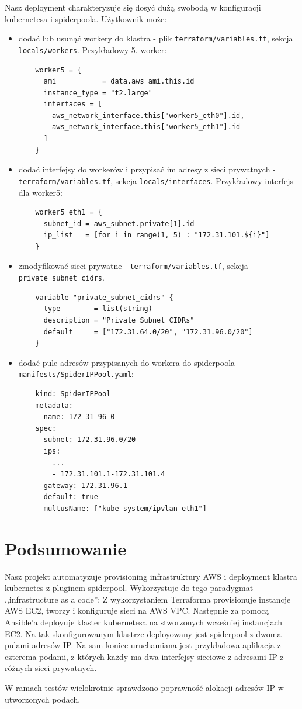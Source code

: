 \documentclass[onecolumn,12pt]{article}
\begin{document}
Nasz deployment charakteryzuje się dosyć dużą swobodą w konfiguracji kubernetesa i spiderpoola.
Użytkownik może:
\begin{itemize}
    \item dodać lub usunąć workery do klastra - plik \texttt{terraform/variables.tf}, sekcja \texttt{locals/workers}. Przykładowy 5. worker:
    \begin{verbatim}
    worker5 = {
      ami           = data.aws_ami.this.id
      instance_type = "t2.large"
      interfaces = [
        aws_network_interface.this["worker5_eth0"].id,
        aws_network_interface.this["worker5_eth1"].id
      ]
    }
    \end{verbatim}

    \item dodać interfejsy do workerów i przypisać im adresy z sieci prywatnych - \texttt{terraform/variables.tf}, sekcja \texttt{locals/interfaces}. Przykładowy interfejs dla worker5:
    \begin{verbatim}
    worker5_eth1 = {
      subnet_id = aws_subnet.private[1].id
      ip_list   = [for i in range(1, 5) : "172.31.101.${i}"]
    }
    \end{verbatim}

    \item zmodyfikować sieci prywatne - \texttt{terraform/variables.tf}, sekcja \texttt{private\_subnet\_cidrs}.
    \begin{verbatim}
    variable "private_subnet_cidrs" {
      type        = list(string)
      description = "Private Subnet CIDRs"
      default     = ["172.31.64.0/20", "172.31.96.0/20"]
    }
    \end{verbatim}

    \item dodać pule adresów przypisanych do workera do spiderpoola - \texttt{manifests/SpiderIPPool.yaml}:
    \begin{verbatim}
    kind: SpiderIPPool
    metadata:
      name: 172-31-96-0
    spec:
      subnet: 172.31.96.0/20
      ips:
        ...
        - 172.31.101.1-172.31.101.4
      gateway: 172.31.96.1
      default: true
      multusName: ["kube-system/ipvlan-eth1"]
    \end{verbatim}
\end{itemize}




\section{Podsumowanie}
Nasz projekt automatyzuje provisioning infrastruktury AWS i deployment klastra kubernetes z pluginem spiderpool.
Wykorzystuje do tego paradygmat ,,infrastructure as a code'':
Z wykorzystaniem Terraforma provisionuje instancje AWS EC2, tworzy i konfiguruje sieci na AWS VPC.
Następnie za pomocą Ansible'a deployuje klaster kubernetesa na stworzonych wcześniej instancjach EC2.
Na tak skonfigurowanym klastrze deployowany jest spiderpool z dwoma pulami adresów IP.
Na sam koniec uruchamiana jest przykładowa aplikacja z czterema podami, z których każdy ma dwa interfejsy sieciowe z adresami IP z różnych sieci prywatnych.

W ramach testów wielokrotnie sprawdzono poprawność alokacji adresów IP w utworzonych podach.

%
\end{document}
